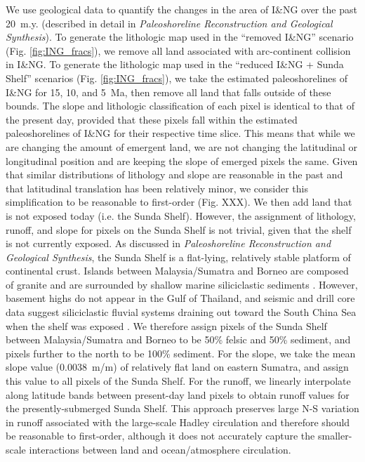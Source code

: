 \documentclass[11pt,letterpaper]{article}
\begin{document}
We use geological data to quantify the changes in the area of I\&NG over the past 20~m.y. (described in detail in \textit{Paleoshoreline Reconstruction and Geological Synthesis}). To generate the lithologic map used in the ``removed I\&NG'' scenario (Fig. \ref{fig:ING_fracs}), we remove all land associated with arc-continent collision in I\&NG. To generate the lithologic map used in the ``reduced I\&NG + Sunda Shelf'' scenarios (Fig. \ref{fig:ING_fracs}), we take the estimated paleoshorelines of I\&NG for 15, 10, and 5~Ma, then remove all land that falls outside of these bounds. The slope and lithologic classification of each pixel is identical to that of the present day, provided that these pixels fall within the estimated paleoshorelines of I\&NG for their respective time slice. This means that while we are changing the amount of emergent land, we are not changing the latitudinal or longitudinal position and are keeping the slope of emerged pixels the same. Given that similar distributions of lithology and slope are reasonable in the past and that latitudinal translation has been relatively minor, we consider this simplification to be reasonable to first-order (Fig. XXX). We then add land that is not exposed today (i.e. the Sunda Shelf). However, the assignment of lithology, runoff, and slope for pixels on the Sunda Shelf is not trivial, given that the shelf is not currently exposed. As discussed in \textit{Paleoshoreline Reconstruction and Geological Synthesis}, the Sunda Shelf is a flat-lying, relatively stable platform of continental crust. Islands between Malaysia/Sumatra and Borneo are composed of granite and are surrounded by shallow marine siliciclastic sediments \citep{Darmadi2007a, Hall2009a, Hall2013b}. However, basement highs do not appear in the Gulf of Thailand, and seismic and drill core data suggest siliciclastic fluvial systems draining out toward the South China Sea when the shelf was exposed \citep{Darmadi2007a}. We therefore assign pixels of the Sunda Shelf between Malaysia/Sumatra and Borneo to be 50\% felsic and 50\% sediment, and pixels further to the north to be 100\% sediment. For the slope, we take the mean slope value (0.0038~m/m) of relatively flat land on eastern Sumatra, and assign this value to all pixels of the Sunda Shelf.  For the runoff, we linearly interpolate along latitude bands between present-day land pixels to obtain runoff values for the presently-submerged Sunda Shelf. This approach preserves large N-S variation in runoff associated with the large-scale Hadley circulation and therefore should be reasonable to first-order, although it does not accurately capture the smaller-scale interactions between land and ocean/atmosphere circulation.
\end{document}
